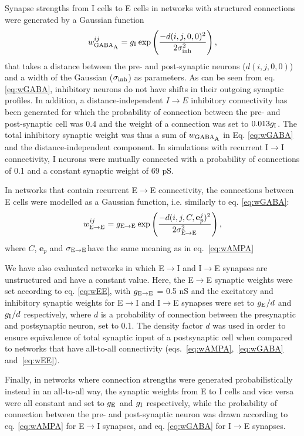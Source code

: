 \documentclass[a4paper,12pt]{article}
\newcommand{\ssc}[3]{\ensuremath{#1_{\text{#2}_{\text{#3}}}}}
\newcommand{\wEE     }{\ssc{w}      {\scriptsize{E}\ensuremath{\rightarrow}\scriptsize{E}}{}}
\newcommand{\wGABAA  }{\ssc{w}      {\scriptsize{GABA}}{\scriptsize{A}}}
\newcommand{\sigmasub}[1]{\ssc{\sigma}{\scriptsize{#1}}{}}
\newcommand{\gE      }{\ssc{g}      {\scriptsize{E}}{}}
\newcommand{\gI      }{\ssc{g}      {\scriptsize{I}}{}}
\newcommand{\gEE     }{\ssc{g}      {\scriptsize{E}\ensuremath{\rightarrow}\scriptsize{E}}{}}
\newcommand{\sigmaEE }{\ssc{\sigma} {\scriptsize{E}\ensuremath{\rightarrow}\scriptsize{E}}{}}
\newcommand{\dijce}{\ensuremath{d(i, j, C, \mathbf{e}_p^j)}}
\newcommand{\dijzz}{\ensuremath{d(i, j, 0, 0)}}
\begin{document}
Synapse strengths from I cells to E cells in networks with structured connections were generated by a Gaussian function
\begin{equation}
    \wGABAA^{ij} = \gI \exp\left(\frac{-d(i, j, 0, 0)^2}{2 \sigmasub{inh}^2}\right),
    \label{eq:wGABA}
\end{equation}
that takes a distance between the pre- and post-synaptic neurons (\dijzz) and a
width of the Gaussian (\sigmasub{inh}) as parameters. As can be seen from eq.
\eqref{eq:wGABA}, inhibitory neurons do not have shifts in their outgoing
synaptic profiles. In addition, a distance-independent $I \rightarrow E$
inhibitory connectivity has been generated for which the probability of connection
between the pre- and post-synaptic cell was 0.4 and the weight of a connection
was set to $0.013\gI$. The total inhibitory synaptic weight was thus a sum of
$\wGABAA$ in Eq. \eqref{eq:wGABA} and the distance-independent component. In
simulations with recurrent I$\rightarrow$I connectivity, I neurons were
mutually connected with a probability of connections of 0.1 and a constant
synaptic weight of 69 pS.

In networks that contain recurrent E$\rightarrow$E connectivity, the
connections between E cells were modelled as a Gaussian function, i.e.
similarly to eq. \eqref{eq:wGABA}:
\begin{equation}
    \wEE^{ij} = \gEE \exp\left(\frac{-\dijce^2}{2 \sigmaEE^2}\right),
    \label{eq:wEE}
\end{equation}
where $C$, $\mathbf{e}_p$ and \sigmaEE have the same meaning as in
eq.~\eqref{eq:wAMPA}

We have also evaluated networks in which E$\rightarrow$I and I$\rightarrow$E
synapses are unstructured and have a constant value. Here, the E$\rightarrow$E
synaptic weights were set according to eq. \eqref{eq:wEE}, with $\gEE$ = 0.5 nS
and the excitatory and inhibitory synaptic weights for E$\rightarrow$I and
I$\rightarrow$E synapses were set to $\gE / d$ and $\gI / d$ respectively,
where $d$ is a probability of connection between the presynaptic and
postsynaptic neuron, set to 0.1. The density factor $d$ was used in order to
ensure equivalence of total synaptic input of a postsynaptic cell when compared
to networks that have all-to-all connectivity
(eqs.~\ref{eq:wAMPA},~\ref{eq:wGABA} and~\ref{eq:wEE}).

Finally, in networks where connection strengths were generated
probabilistically instead in an all-to-all way, the synaptic weights from E to
I cells and vice versa were all constant and set to $\gE$ and $\gI$
respectively, while the probability of connection between the pre- and
post-synaptic neuron was drawn according to
eq. \eqref{eq:wAMPA} for E$\rightarrow$I synapses, and eq. \eqref{eq:wGABA} for
I$\rightarrow$E synapses.
\end{document}
